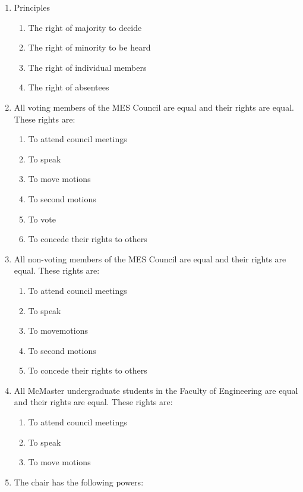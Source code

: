\begin{enumerate}
 \item
  Principles

  \begin{enumerate}
   \item
    The right of majority to decide
   \item
    The right of minority to be heard
   \item
    The right of individual members
   \item
    The right of absentees
  \end{enumerate}
 \item
  All voting members of the MES Council are equal and their rights are
  equal. These rights are:

  \begin{enumerate}
   \item
    To attend council meetings
   \item
    To speak
   \item
    To move motions
   \item
    To second motions
   \item
    To vote
   \item
    To concede their rights to others
  \end{enumerate}
 \item
  All non-voting members of the MES Council are equal and their rights
  are equal. These rights are:

  \begin{enumerate}
   \item
    To attend council meetings
   \item
    To speak
   \item
    To movemotions
   \item
    To second motions
   \item
    To concede their rights to others
  \end{enumerate}
 \item
  All McMaster undergraduate students in the Faculty of Engineering are
  equal and their rights are equal. These rights are:

  \begin{enumerate}
   \item
    To attend council meetings
   \item
    To speak
   \item
    To move motions
  \end{enumerate}
 \item
  The chair has the following powers:


\end{enumerate}
